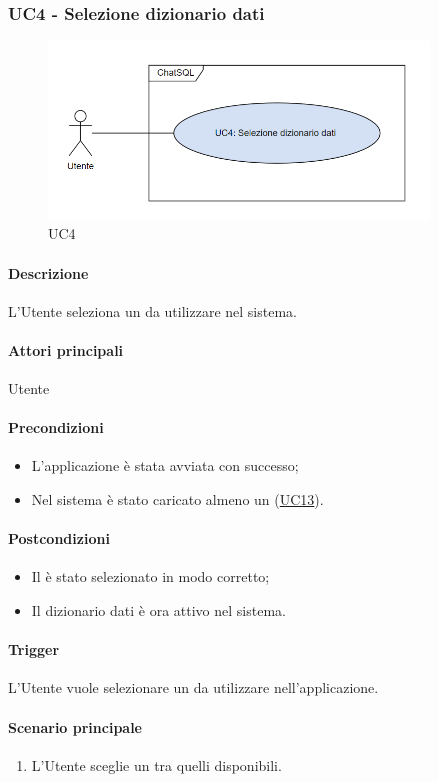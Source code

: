 \subsubsection{UC4 - Selezione dizionario dati}\label{UC4}

\begin{figure}[H]
  \centering
  \includegraphics[width=0.90\textwidth]{assets/uc4.png}
  \caption{UC4}
\end{figure}

\paragraph*{Descrizione}
L'Utente seleziona un  da utilizzare nel sistema.

\paragraph*{Attori principali}
Utente

\paragraph*{Precondizioni}
\begin{itemize}
  \item L'applicazione è stata avviata con successo;
  \item Nel sistema è stato caricato almeno un  (\hyperref[UC13]{UC13}).
\end{itemize}

\paragraph*{Postcondizioni}
\begin{itemize}
  \item Il  è stato selezionato in modo corretto;
  \item Il dizionario dati è ora attivo nel sistema.
\end{itemize}

\paragraph*{Trigger}
L'Utente vuole selezionare un  da utilizzare nell'applicazione.

\paragraph*{Scenario principale}
\begin{enumerate}
  \item L'Utente sceglie un  tra quelli disponibili.
\end{enumerate}